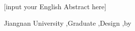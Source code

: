 \jnabstract[en]   %

[input your English Abstract here]


\begin{jnkeywords}[en]
    Jiangnan University \sep Graduate \sep Design \sep by \XeLaTeX
\end{jnkeywords}
